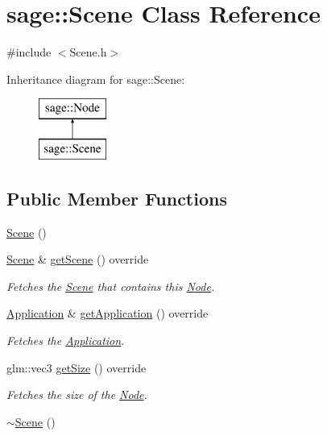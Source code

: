 \hypertarget{classsage_1_1Scene}{}\section{sage\+::Scene Class Reference}
\label{classsage_1_1Scene}


{\ttfamily \#include $<$Scene.\+h$>$}

Inheritance diagram for sage\+::Scene\+:\begin{figure}[H]
\begin{center}
\leavevmode
\includegraphics[height=2.000000cm]{classsage_1_1Scene}
\end{center}
\end{figure}
\subsection*{Public Member Functions}
\begin{DoxyCompactItemize}
\item 
\mbox{\hyperlink{classsage_1_1Scene_ad10176d75a9cc0da56626f682d083507}{Scene}} ()
\item 
\mbox{\hyperlink{classsage_1_1Scene}{Scene}} \& \mbox{\hyperlink{classsage_1_1Scene_a2fec0ba5c1b495c89dea471f5a175f2e}{get\+Scene}} () override
\begin{DoxyCompactList}\small\item\em Fetches the \mbox{\hyperlink{classsage_1_1Scene}{Scene}} that contains this \mbox{\hyperlink{classsage_1_1Node}{Node}}. \end{DoxyCompactList}\item 
\mbox{\hyperlink{classsage_1_1Application}{Application}} \& \mbox{\hyperlink{classsage_1_1Scene_ae81f9c71c6a8e6e57b1759018a3e0a3c}{get\+Application}} () override
\begin{DoxyCompactList}\small\item\em Fetches the \mbox{\hyperlink{classsage_1_1Application}{Application}}. \end{DoxyCompactList}\item 
glm\+::vec3 \mbox{\hyperlink{classsage_1_1Scene_aebf891e256b5ca03ffef8903eb1c63e4}{get\+Size}} () override
\begin{DoxyCompactList}\small\item\em Fetches the size of the \mbox{\hyperlink{classsage_1_1Node}{Node}}. \end{DoxyCompactList}\item 
\mbox{\hyperlink{classsage_1_1Scene_a3b8cec2e32546713915f8c6303c951f1}{$\sim$\+Scene}} ()
\end{DoxyCompactItemize}
